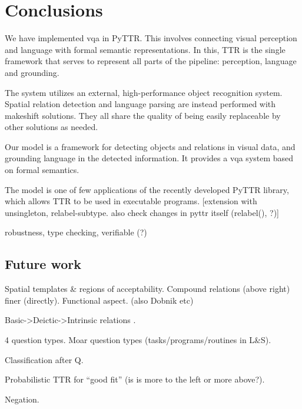 \section{Conclusions}
\label{sec:conclusions}

We have implemented \gls{vqa} in PyTTR.
This involves connecting visual perception and language with formal semantic representations.
In this, TTR is the single framework that serves to represent all parts of the pipeline: perception, language and grounding.

The system utilizes an external, high-performance object recognition system.
Spatial relation detection and language parsing are instead performed with makeshift solutions.
They all share the quality of being easily replaceable by other solutions as needed.

Our model is a framework for detecting objects and relations in visual data, and grounding language in the detected information.
It provides a \gls{vqa} system based on formal semantics.

The model is one of few applications of the recently developed PyTTR library, which allows TTR to be used in executable programs.
[extension with unsingleton, relabel-subtype. also check changes in pyttr itself (relabel(), ?)]


robustness, type checking, verifiable (?)



\subsection{Future work}


Spatial templates \& regions of acceptability. Compound relations (above right) finer (directly). Functional aspect.  \cite{LoganComputationalAnalysisApprehension1996} (also Dobnik etc)

Basic->Deictic->Intrinsic relations  \cite{LoganComputationalAnalysisApprehension1996}.

4 question types.
Moar question types (tasks/programs/routines in L\&S).


Classification after Q.

Probabilistic TTR for ``good fit'' (is is more to the left or more above?).

Negation.
